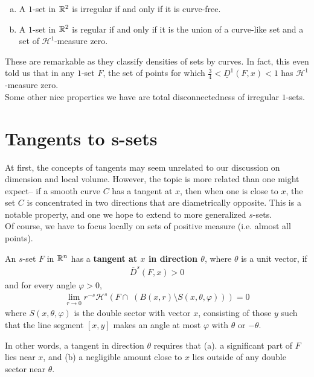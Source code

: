 \documentclass{memoir}
\begin{document}
\begin{thm}
	\begin{enumerate}[(a).]
		\item A \(1\)-set in \(\mathbb{R}^2\) is irregular if and only if it is curve-free.
		\item A \(1\)-set in \(\mathbb{R}^2\) is regular if and only if it is the union of a curve-like set and a set of \(\mathcal{H}^{1}\)-measure zero.
	\end{enumerate}
\end{thm}

These are remarkable as they classify densities of sets by curves. In fact, this even told us that in any \(1\)-set \(F\), the set of points for which \(\frac{3}{4} < \underline{D}^{1}(F,x) < 1\) has \(\mathcal{H}^{1}\)-measure zero.\\

Some other nice properties we have are total disconnectedness of irregular \(1\)-sets.


\section{Tangents to s-sets}
\label{sec:tangents_to_s_sets}

At first, the concepts of tangents may seem unrelated to our discussion on dimension and local volume. However, the topic is more related than one might expect-- if a smooth curve \(C\) has a tangent at \(x\), then when one is close to \(x\), the set \(C\) is concentrated in two directions that are diametrically opposite. This is a notable property, and one we hope to extend to more generalized \(s\)-sets.\\

Of course, we have to focus locally on sets of positive measure (i.e. almost all points).

\begin{defn}[Tangent]
	An \(s\)-set \(F\) in \(\mathbb{R}^{n}\) has a \textbf{tangent at \(x\) in direction \(\theta \)}, where \(\theta \) is a unit vector, if
	\begin{align*}
		\overline{D}^{s}(F,x) > 0
	\end{align*}
	and for every angle \(\varphi >0\),
	\begin{align*}
		\lim_{r \to 0} r^{-s} \mathcal{H}^{s}(F \cap \; (B(x,r)\setminus S(x,\theta ,\varphi ))) = 0
	\end{align*}
	where \(S(x,\theta ,\varphi )\) is the double sector with vector \(x\), consisting of those \(y\) such that the line segment \([x,y]\) makes an angle at most \(\varphi \) with \(\theta \) or \(-\theta \).
\end{defn}
In other words, a tangent in direction \(\theta \) requires that (a). a significant part of \(F\) lies near \(x\), and (b) a negligible amount close to \(x\) lies outside of any double sector near \(\theta \).\\
\end{document}
